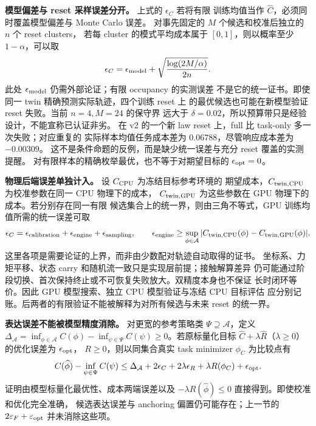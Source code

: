 \textbf{模型偏差与 reset 采样误差分开。} 上式的 $\epsilon_C$ 若将有限
训练均值当作 $\widehat C$，必须同时覆盖模型偏差与 Monte Carlo 误差。
对事先固定的 $M$ 个候选和校准后独立的 $n$ 个 reset clusters，
若每 cluster 的模式平均成本属于 $[0,1]$，则以概率至少 $1-\alpha$，可以取
\[
 \epsilon_C=\epsilon_{\rm model}
       +\sqrt{\frac{\log(2M/\alpha)}{2n}}.
\]
此处 $\epsilon_{\rm model}$ 仍需外部论证；有限 occupancy 的实测误差
不是它的统一证书。即使同一 twin 精确预测实际轨迹，四个训练 reset 上
的最优候选也可能在新模型验证 reset 失败。当前 $n=4,M=24$ 的保守界
远大于 $\delta=0.02$，所以预算带只是经验设计，不能宣称已认证非劣。
在 v2 的一个新 law reset 上，full 比 task-only 多一次失败；对应重复的
实际样本均值任务成本差为 $0.06788$，尽管响应成本差为 $-0.00309$。
这不是条件命题的反例，而是缺少统一误差与充分 reset 覆盖的实测提醒。
对有限样本的精确枚举最优，也不等于对期望目标的 $\epsilon_{\rm opt}=0$。

\textbf{物理后端误差单独计入。} 设 $C_{\rm CPU}$ 为冻结目标参考环境的
期望成本，$C_{\rm twin,CPU}$ 为校准参数在同一 CPU 物理下的成本，
$C_{\rm twin,GPU}$ 为这些参数在 GPU 物理下的成本。若分别存在同一有限
候选集合上的统一界，则由三角不等式，GPU 训练均值所需的统一误差可取
\[
 \epsilon_C = \epsilon_{\rm calibration}
                  +\epsilon_{\rm engine}
                  +\epsilon_{\rm sampling},\qquad
 \epsilon_{\rm engine}\ge
 \sup_{\phi\in\mathcal A}
 |C_{\rm twin,CPU}(\phi)-C_{\rm twin,GPU}(\phi)|.
\]
这里各项是需要论证的上界，而非由少数配对轨迹自动取得的证书。
坐标系、力矩平移、状态 carry 和随机流一致只是实现层前提；接触解算差异
仍可能通过阶段切换、首次保持终止或不可恢复失败放大。双精度本身也不保证
长时闭环等价。因此 GPU 模型搜索、独立 CPU 模型验证与冻结 CPU 目标评估
应分别记账。后两者的有限验证不能被解释为对所有候选与未来 reset 的统一界。

\textbf{表达误差不能被模型精度消除。} 对更宽的参考策略类
$\Psi\supseteq\mathcal A$，定义
$\Delta_{\mathcal A}=\inf_{\phi\in\mathcal A}C(\phi)-
\inf_{\psi\in\Psi}C(\psi)\ge0$。若原标量化目标
$\widehat C+\lambda\widehat R$（$\lambda\ge0$）的优化误差为 $\epsilon_{\rm opt}$，
$R\ge0$，则以同集合真实 task minimizer $\phi_C$ 为比较点有
\begin{equation}
 C(\widehat\phi)-\inf_{\psi\in\Psi}C(\psi)
 \le\Delta_{\mathcal A}+2\epsilon_C+2\lambda\epsilon_R
   +\lambda R(\phi_C)+\epsilon_{\rm opt}.
\end{equation}
证明由模型标量化最优性、成本两端误差以及
$-\lambda R(\widehat\phi)\le0$ 直接得到。即使校准和优化完全准确，
候选表达误差与 anchoring 偏置仍可能存在；上一节的
$2\varepsilon_F+\varepsilon_{\rm opt}$ 并未消除这些项。

